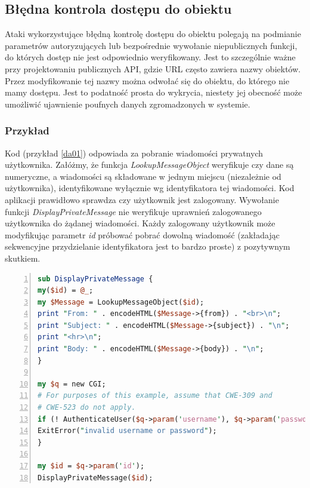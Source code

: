 \documentclass[11pt,a4paper,polish,thesis]{dcsbook}
\begin{document}
\subsection{Błędna kontrola dostępu do obiektu}
Ataki wykorzystujące błędną kontrolę dostępu do obiektu polegają na podmianie parametrów autoryzujących lub bezpośrednie wywołanie niepublicznych funkcji, do których dostęp nie jest odpowiednio weryfikowany. Jest to szczególnie ważne przy projektowaniu publicznych API, gdzie URL często zawiera nazwy obiektów. Przez modyfikowanie tej nazwy można odwołać się do obiektu, do którego nie mamy dostępu. Jest to podatność prosta do wykrycia, niestety jej obecność może umożliwić ujawnienie poufnych danych zgromadzonych w systemie.

\subsubsection*{Przykład}
Kod (przykład \ref{da01}) odpowiada za pobranie wiadomości prywatnych użytkownika. Załóżmy, że funkcja \textit{LookupMessageObject} weryfikuje czy dane są numeryczne, a wiadomości są składowane w jednym miejscu (niezależnie od użytkownika), identyfikowane wyłącznie wg identyfikatora tej wiadomości. Kod aplikacji prawidłowo sprawdza czy użytkownik jest zalogowany. Wywołanie funkcji \textit{DisplayPrivateMessage} nie weryfikuje uprawnień zalogowanego użytkownika do żądanej wiadomości. Każdy zalogowany użytkownik może modyfikując parametr \textit{id} próbować pobrać dowolną wiadomość (zakładając sekwencyjne przydzielanie identyfikatora jest to bardzo proste) z pozytywnym skutkiem.

\begin{lstlisting}[language=perl,frame=single,caption=przykładowy kod podatny na bezpośrednie odwołanie \cite{directaccess},label=da01,numbers=left]
sub DisplayPrivateMessage {
my($id) = @_;
my $Message = LookupMessageObject($id);
print "From: " . encodeHTML($Message->{from}) . "<br>\n";
print "Subject: " . encodeHTML($Message->{subject}) . "\n";
print "<hr>\n";
print "Body: " . encodeHTML($Message->{body}) . "\n";
}

my $q = new CGI;
# For purposes of this example, assume that CWE-309 and
# CWE-523 do not apply.
if (! AuthenticateUser($q->param('username'), $q->param('password'))) {
ExitError("invalid username or password");
}

my $id = $q->param('id');
DisplayPrivateMessage($id);
\end{lstlisting}
\end{document}
